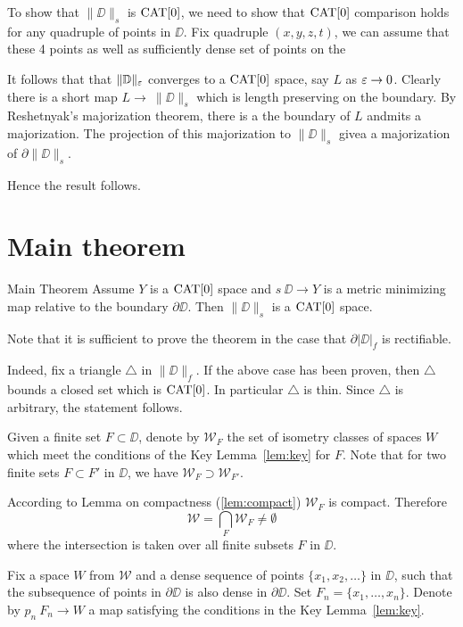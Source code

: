 \documentclass[a4paper,10pt]{amsart}
\begin{document}
To show that $\|\DD\|_s$ is $\mathop{\rm CAT}\nolimits[0]$,
we need to show that $\mathop{\rm CAT}\nolimits[0]$ comparison holds for any quadruple of points  in $\DD$.
Fix quadruple $(x,y,z,t)$, we can assume that these 4 points as well as sufficiently dense set of points on the

It follows that that $\|\mathbb{D}\|_\varepsilon$ converges to a $\mathop{\rm CAT}\nolimits[0]$ space, say $L$ as $\varepsilon\to 0$. 
Clearly there is a short map $L\to\ \|\DD\|_s$ which is length preserving on the boundary.
By Reshetnyak's majorization theorem, there is a the boundary of $L$ andmits a majorization.
The projection of this majorization to $\|\DD\|_s$ givea a majorization of $\partial\|\DD\|_s$.\longrightarrow

Hence the result follows.
\qeds



\section{Main theorem}

\begin{thm}{Main Theorem}
Assume $Y$ is a $\mathop{\rm CAT}\nolimits[0]$ space 
and $s\:\DD\to Y$ is a metric minimizing map relative to the boundary $\partial\DD$.
Then $\|\DD\|_s$ is a $\mathop{\rm CAT}\nolimits[0]$ space.
\end{thm}


Note that it is sufficient to prove the theorem 
in the case that $\partial |\DD|_f$ is rectifiable.

Indeed, fix a triangle $\triangle$ in $\|\DD\|_f$.
If the above case has been proven, 
then $\triangle$ bounds a closed set which is $\mathop{\rm CAT}\nolimits[0]$.
In particular $\triangle$ is thin.
Since $\triangle$ is arbitrary, the statement follows.

Given a finite set $F\subset \DD$,
denote by $\mathcal{W}_F$
the set of isometry classes of spaces $W$ which meet the conditions of the Key Lemma~\ref{lem:key}
for $F$.
Note that for two finite sets $F\subset F'$ in $\DD$,
we have $\mathcal{W}_F\supset \mathcal{W}_{F'}$.

According to Lemma on compactness (\ref{lem:compact}) $\mathcal{W}_F$ is compact.
Therefore 
\[\mathcal{W}
=
\bigcap_{F}\mathcal{W}_F\ne \emptyset\]
where the intersection is taken over all finite subsets $F$ in $\DD$.

Fix a space $W$ from $\mathcal{W}$
and a dense sequence of points $\{x_1,x_2,\dots\}$ in $\DD$,
such that the subsequence of points in $\partial \DD$
is also dense in $\partial \DD$.
Set $F_n=\{x_1,\dots,x_n\}$.
Denote by $p_n\:F_n\to W$ a map satisfying the conditions in the Key Lemma~\ref{lem:key}.
\end{document}
